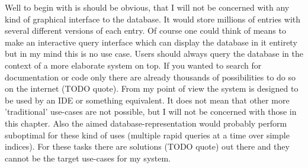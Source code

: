 \documentclass[twoside, 11pt]{scrartcl}
\begin{document}
Well to begin with is should be obvious, that I will not be concerned with any kind of graphical interface to the database. It would store millions of entries with several different versions of each entry. Of course one could think of means to make an interactive query interface which can display the database in it entirety but in my mind this is no use case. Users should always query the database in the context of a more elaborate system on top. If you wanted to search for documentation or code only there are already thousands of possibilities to do so on the internet (TODO quote).
From my point of view the system is designed to be used by an IDE or something equivalent. It does not mean that other more 'traditional' use-cases are not possible, but I will not be concerned with those in this chapter. Also the aimed database-representation would probably perform suboptimal for these kind of uses (multiple rapid queries at a time over simple indices). For these tasks there are solutions (TODO quote) out there and they cannot be the target use-cases for my system.
\end{document}

